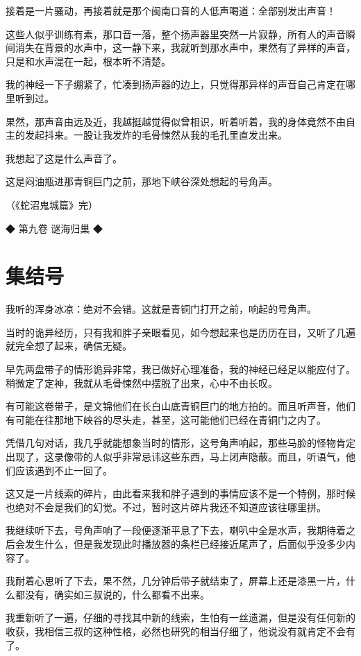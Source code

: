 接着是一片骚动，再接着就是那个闽南口音的人低声喝道：全部别发出声音！

这些人似乎训练有素，那口音一落，整个扬声器里突然一片寂静，所有人的声音瞬间消失在背景的水声中，这一静下来，我就听到那水声中，果然有了异样的声音，只是和水声混在一起，根本听不清楚。

我的神经一下子绷紧了，忙凑到扬声器的边上，只觉得那异样的声音自己肯定在哪里听到过。

果然，那声音由远及近，我越挺越觉得似曾相识，听着听着，我的身体竟然不由自主的发起抖来。一股让我发炸的毛骨悚然从我的毛孔里直发出来。

我想起了这是什么声音了。

这是闷油瓶进那青铜巨门之前，那地下峡谷深处想起的号角声。

（《蛇沼鬼城篇》完）

◆ 第九卷 谜海归巢 ◆

\chapter{集结号}

我听的浑身冰凉：绝对不会错。这就是青铜门打开之前，响起的号角声。

当时的诡异经历，只有我和胖子亲眼看见，如今想起来也是历历在目，又听了几遍就完全想了起来，确信无疑。

早先两盘带子的情形诡异非常，我已做好心理准备，我的神经已经足以能应付了。稍微定了定神，我就从毛骨悚然中摆脱了出来，心中不由长叹。

有可能这卷带子，是文锦他们在长白山底青铜巨门的地方拍的。而且听声音，他们有可能在往那地下峡谷的尽头走，甚至，这可能他们已经在青铜门之内了。

凭借几句对话，我几乎就能想象当时的情形，这号角声响起，那些马脸的怪物肯定出现了，这录像带的人似乎非常忌讳这些东西，马上闭声隐蔽。而且，听语气，他们应该遇到不止一回了。

这又是一片线索的碎片，由此看来我和胖子遇到的事情应该不是一个特例，那时候也绝对不会是我们的幻觉。不过，暂时这片碎片我还不知道应该往哪里拼。

我继续听下去，号角声响了一段便逐渐平息了下去，喇叭中全是水声，我期待着之后会发生什么，但是我发现此时播放器的条栏已经接近尾声了，后面似乎没多少内容了。

我耐着心思听了下去，果不然，几分钟后带子就结束了，屏幕上还是漆黑一片，什么都没有，确实如三叔说的，什么都看不出来。

我重新听了一遍，仔细的寻找其中新的线索，生怕有一丝遗漏，但是没有任何新的收获，我相信三叔的这种性格，必然也研究的相当仔细了，他说没有就肯定不会有了。

